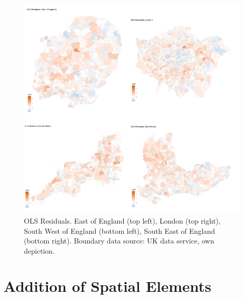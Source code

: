 \documentclass[12pt,twoside]{reedthesis}
\begin{document}
\begin{figure}
\includegraphics[width=0.95\linewidth]{figure/Figure_16} \caption{OLS Residuals. East of England (top left), London (top right), South West of England (bottom left), South East of England (bottom right). Boundary data source: UK data service, own depiction.}\label{fig:figure16}
\end{figure}
\hypertarget{addition-of-spatial-elements}{%
\section{Addition of Spatial Elements}\label{addition-of-spatial-elements}}
\end{document}
